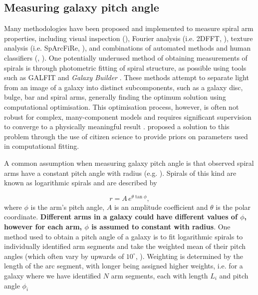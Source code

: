 \label{section:method}

\subsection{Measuring galaxy pitch angle}
Many methodologies have been proposed and implemented to measure spiral arm properties, including visual inspection (\citealt{2015A&A...582A..86H}), Fourier analysis (i.e. \textsc{2DFFT}, \citealt{2012ApJS..199...33D}), texture analysis (i.e. SpArcFiRe, \citealt{2014ApJ...790...87D}), and combinations of automated methods and human classifiers (\citealt{2017MNRAS.472.2263H}, \citealt{2020MNRAS.493.3854H}). One potentially underused method of obtaining measurements of spirals is through photometric fitting of spiral structure, as possible using tools such as \textsc{GALFIT} \citep{2010AJ....139.2097P} and \textit{Galaxy Builder} \citep{2020arXiv200610450L}. These methods attempt to separate light from an image of a galaxy into distinct subcomponents, such as a galaxy disc, bulge, bar and spiral arms, generally finding the optimum solution using computational optimisation. This optimisation process, however, is often not robust for complex, many-component models and requires significant supervision to converge to a physically meaningful result \citep{Gao2017:1709.00746v1}. \citet{2020arXiv200610450L} proposed a solution to this problem through the use of citizen science to provide priors on parameters used in computational fitting.

A common assumption when measuring galaxy pitch angle is that observed spiral arms have a constant pitch angle with radius (e.g. \citealt{2012ApJS..199...33D,2013MNRAS.436.1074S,2014ApJ...790...87D}). Spirals of this kind are known as logarithmic spirals and are described by

\begin{equation}
  \label{eq:log-spiral}
r = A\,e^{\theta\tan\phi},
\end{equation}
%
where $\phi$ is the arm's pitch angle, $A$ is an amplitude coefficient and $\theta$ is the polar coordinate. \textbf{Different arms in a galaxy could have different values of $\phi$, however for each arm, $\phi$ is assumed to constant with radius}. One method used to obtain a pitch angle of a galaxy is to fit logarithmic spirals to individually identified arm segments and take the weighted mean of their pitch angles (which often vary by upwards of $10^\circ$, \citealt{2014ApJ...790...87D}). Weighting is determined by the length of the arc segment, with longer being assigned higher weights, i.e. for a galaxy where we have identified $N$ arm segments, each with length $L_i$ and pitch angle $\phi_i$

